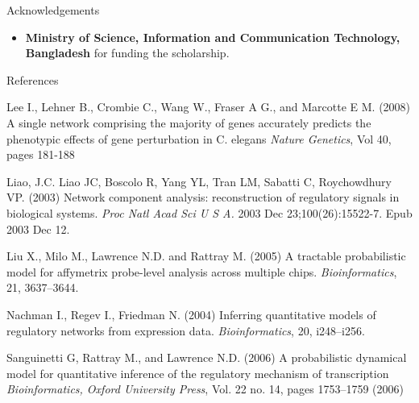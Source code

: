 \documentclass[serif,mathserif,final]{beamer}
\begin{document}
\begin{frame}{}
\begin{columns}[t]
\begin{column}{0.24\linewidth}
\begin{block}{Acknowledgements}
\begin{itemize}
      \item {\bf Ministry of Science, Information and Communication Technology, Bangladesh} for funding the scholarship.

      \end{itemize}
      
      \end{block}

      \begin{block}{References}
                
	\footnotesize{
	\begin{thebibliography}{99} %

	 Lee I., Lehner B., Crombie C., Wang W., Fraser A G., and Marcotte E M. (2008)
	\newblock A single network comprising the majority of genes accurately predicts the phenotypic effects of gene perturbation in C. elegans
	\newblock \emph{Nature Genetics}, Vol 40, pages 181-188 
	
	 Liao, J.C. Liao JC, Boscolo R, Yang YL, Tran LM, Sabatti C, Roychowdhury VP. (2003)
	\newblock Network component analysis: reconstruction of regulatory signals in biological systems.
	\newblock \emph{Proc Natl Acad Sci U S A.} 2003 Dec 23;100(26):15522-7. Epub 2003 Dec 12.

	 Liu X., Milo M., Lawrence N.D. and Rattray M. (2005) 
	\newblock A tractable probabilistic model for affymetrix probe-level analysis across multiple chips. 
	\newblock \emph {Bioinformatics}, 21, 3637–3644.

	Nachman I., Regev I., Friedman N. (2004) 
	\newblock Inferring quantitative models of regulatory networks from expression data. 
	\newblock \emph{Bioinformatics}, 20, i248–i256.

	 Sanguinetti G, Rattray M., and Lawrence N.D. (2006)
	\newblock A probabilistic dynamical model for quantitative inference of the regulatory mechanism of transcription
	\newblock \emph{Bioinformatics, Oxford University Press}, Vol. 22 no. 14, pages 1753–1759 (2006)
	
	\end{thebibliography}
	}
                
      \end{block}

    \end{column}%
    
  \end{columns}
\end{frame}
\end{document}
